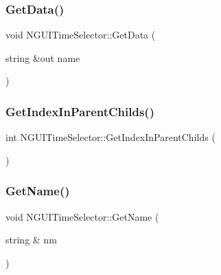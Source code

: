 \hypertarget{class_n_g_u_i_time_selector_af5b0af82c4140a643ddb763ab7acb280}{}\label{class_n_g_u_i_time_selector_af5b0af82c4140a643ddb763ab7acb280} 
\subsubsection{\texorpdfstring{Get\+Data()}{GetData()}}
{\footnotesize\ttfamily void N\+G\+U\+I\+Time\+Selector\+::\+Get\+Data (\begin{DoxyParamCaption}\item[{string \&out}]{name }\end{DoxyParamCaption})}

\hypertarget{class_n_g_u_i_time_selector_a92b4775af1e1659eb8932785d9a03a32}{}\label{class_n_g_u_i_time_selector_a92b4775af1e1659eb8932785d9a03a32} 
\subsubsection{\texorpdfstring{Get\+Index\+In\+Parent\+Childs()}{GetIndexInParentChilds()}}
{\footnotesize\ttfamily int N\+G\+U\+I\+Time\+Selector\+::\+Get\+Index\+In\+Parent\+Childs (\begin{DoxyParamCaption}{ }\end{DoxyParamCaption})}

\hypertarget{class_n_g_u_i_time_selector_ad4ff5c20b517530acc14eac994630e49}{}\label{class_n_g_u_i_time_selector_ad4ff5c20b517530acc14eac994630e49} 
\subsubsection{\texorpdfstring{Get\+Name()}{GetName()}}
{\footnotesize\ttfamily void N\+G\+U\+I\+Time\+Selector\+::\+Get\+Name (\begin{DoxyParamCaption}\item[{string \&}]{nm }\end{DoxyParamCaption})}

